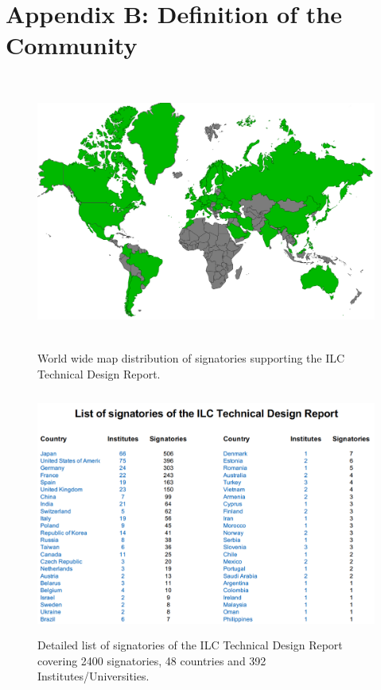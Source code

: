 \documentclass[%
reprint,
 floatfix,
 amsmath,amssymb,
 aps,
]{revtex4-1}
\begin{document}
\newpage

\section*{\label{Appendix2} \Large{Appendix B: Definition of the Community}} 
\begin{figure}[h]
 \begin{center}
 \includegraphics[width=\hsize,height=9cm]{figures/WorldSignatoriesTDR.png}
\caption{World wide map distribution of signatories supporting the ILC Technical Design Report. \label{TDRsignatories}}
 \end{center}
 \end{figure}
 
 \begin{figure}[h]
 \begin{center}
 \includegraphics[width=\hsize,height=8cm]{figures/CountriesInstitutes.png}
\caption{Detailed list of signatories of the ILC Technical Design Report covering 2400 signatories, 48 countries and 392 Institutes/Universities. \label{TDRsignatories}}
 \end{center}
 \end{figure}
\end{document}
